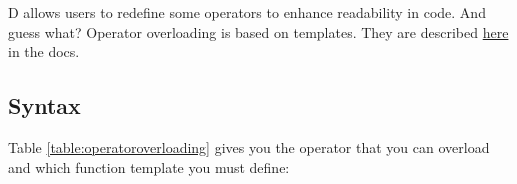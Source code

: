 

D allows users to redefine some operators to enhance readability in code. And guess what? Operator overloading is based on templates. They are described \href{www.dlang.org/operators.html}{here} in the docs. 

\subsection{Syntax}

Table \ref{table:operatoroverloading} gives you the operator that you can overload and which function template you must define:


